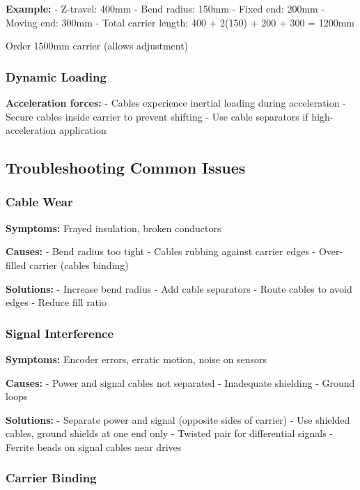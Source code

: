 \documentclass[
]{article}
\begin{document}
\textbf{Example:} - Z-travel: 400mm - Bend radius: 150mm - Fixed end:
200mm - Moving end: 300mm - Total carrier length: 400 + 2(150) + 200 +
300 = 1200mm

Order 1500mm carrier (allows adjustment)

\subsubsection{Dynamic Loading}\label{dynamic-loading}

\textbf{Acceleration forces:} - Cables experience inertial loading
during acceleration - Secure cables inside carrier to prevent shifting -
Use cable separators if high-acceleration application

\subsection{Troubleshooting Common
Issues}\label{troubleshooting-common-issues-1}

\subsubsection{Cable Wear}\label{cable-wear}

\textbf{Symptoms:} Frayed insulation, broken conductors

\textbf{Causes:} - Bend radius too tight - Cables rubbing against
carrier edges - Over-filled carrier (cables binding)

\textbf{Solutions:} - Increase bend radius - Add cable separators -
Route cables to avoid edges - Reduce fill ratio

\subsubsection{Signal Interference}\label{signal-interference}

\textbf{Symptoms:} Encoder errors, erratic motion, noise on sensors

\textbf{Causes:} - Power and signal cables not separated - Inadequate
shielding - Ground loops

\textbf{Solutions:} - Separate power and signal (opposite sides of
carrier) - Use shielded cables, ground shields at one end only - Twisted
pair for differential signals - Ferrite beads on signal cables near
drives

\subsubsection{Carrier Binding}\label{carrier-binding}
\end{document}

